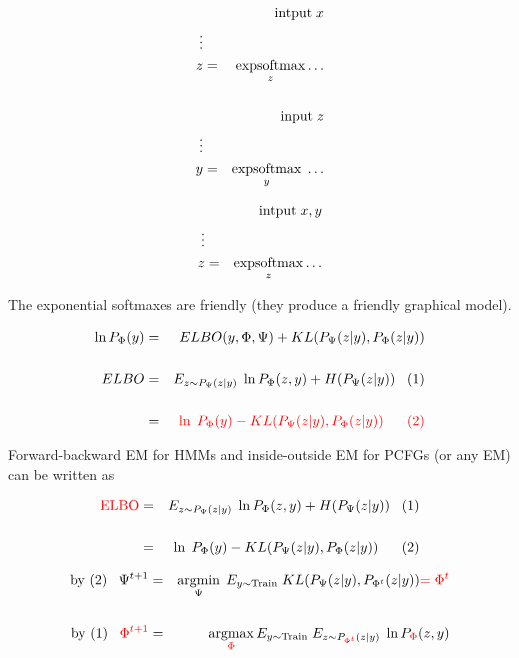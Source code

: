 {\vfill
{\huge \color{red}
\parbox{4.0in}{
\begin{eqnarray*}
& & \mbox{intput}\; x \\
\vdots \\
z & = & \operatorname*{expsoftmax}_z \ldots \\
\\
& & \mbox{input}\; z \\
\vdots \\
y & = & \operatorname*{expsoftmax}_y\;\ldots
\end{eqnarray*}
}
\hfill
\parbox{4.0in}{
\begin{eqnarray*}
& & \mbox{intput}\; x,y \\
\vdots \\
z & = & \operatorname*{expsoftmax}_z \ldots \\
\end{eqnarray*}
}
}
\vfill
The exponential softmaxes are friendly (they produce a friendly graphical model).


\begin{eqnarray*}
\ln P_\Phi(y) & = & ELBO(y,\Phi,\Psi) + KL(P_\Psi(z|y),P_\Phi(z|y)) \\
\\
 ELBO & = & E_{z \sim P_\Psi(z|y)}\; \ln P_\Phi(z,y) + H(P_\Psi(z|y))\;\;\;(1) \\
 \\      
  & = &{\color{red} \ln\;P_{\Phi}(y) - KL(P_\Psi(z|y),P_{\Phi}(z|y))\;\;\;\;\;\;(2)}
\end{eqnarray*}

Forward-backward EM for HMMs and inside-outside EM for PCFGs (or any EM) can be written as

\vfill
\begin{eqnarray*}
\mathrm{\color{red} ELBO}& = & E_{z \sim P_\Psi(z|y)}\; \ln P_\Phi(z,y) + H(P_\Psi(z|y))\;\;\;(1) \\
 \\      
  & = & \ln\;P_{\Phi}(y) - KL(P_\Psi(z|y),P_{\Phi}(z|y))\;\;\;\;\;\;(2)
\end{eqnarray*}

\vfill
\begin{eqnarray*}
\mbox{by (2)}\;\;\;\Psi^{t+1} & = & \operatorname*{argmin}_\Psi \;E_{y \sim \mathrm{Train}} \; KL(P_{\Psi}(z|y),P_{\Phi^t}(z|y)) {\color{red} = \Phi^t} \\
\\
\mbox{by (1)}\;\;\;{\color{red} \Phi^{t+1}} & = & \operatorname*{argmax}_{\color{red} \Phi} E_{y \sim \mathrm{Train}} \;E_{z \sim P_{\color{red} {\Phi^t}}(z|y)}\; \ln P_{\color{red} \Phi}(z,y)
\end{eqnarray*}

}
